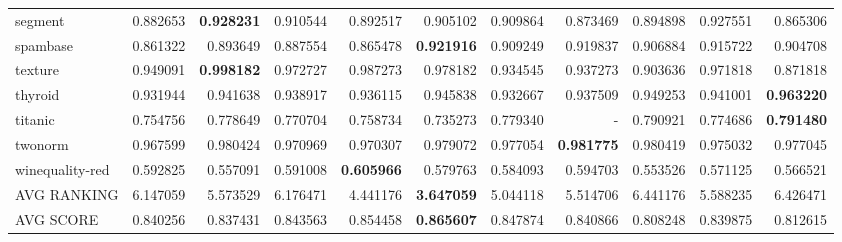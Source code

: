 \begin{tabular}{lrrrrrrrrrr}
segment         &   0.882653 &  \textbf{0.928231} &  0.910544 &  0.892517 &  0.905102 &  0.909864 &  0.873469 &  0.894898 &  0.927551 &  0.865306 \\
spambase        &   0.861322 &  0.893649 &  0.887554 &  0.865478 &  \textbf{0.921916} &  0.909249 &  0.919837 &  0.906884 &  0.915722 &  0.904708 \\
texture         &   0.949091 &  \textbf{0.998182} &  0.972727 &  0.987273 &  0.978182 &  0.934545 &  0.937273 &  0.903636 &  0.971818 &  0.871818 \\
thyroid         &   0.931944 &  0.941638 &  0.938917 &  0.936115 &  0.945838 &  0.932667 &  0.937509 &  0.949253 &  0.941001 &  \textbf{0.963220} \\
titanic         &   0.754756 &  0.778649 &  0.770704 &  0.758734 &  0.735273 &  0.779340 &       - &  0.790921 &  0.774686 &  \textbf{0.791480} \\
twonorm         &   0.967599 &  0.980424 &  0.970969 &  0.970307 &  0.979072 &  0.977054 &  \textbf{0.981775} &  0.980419 &  0.975032 &  0.977045 \\
winequality-red &   0.592825 &  0.557091 &  0.591008 &  \textbf{0.605966} &  0.579763 &  0.584093 &  0.594703 &  0.553526 &  0.571125 &  0.566521 \\
\bottomrule
AVG RANKING & 6.147059 & 5.573529 & 6.176471 & 4.441176 & \textbf{3.647059} & 5.044118 & 5.514706 & 6.441176 & 5.588235 & 6.426471 \\
AVG SCORE & 0.840256 & 0.837431 & 0.843563 & 0.854458 & \textbf{0.865607} & 0.847874 & 0.840866 & 0.808248 & 0.839875 & 0.812615 \\
\end{tabular}
